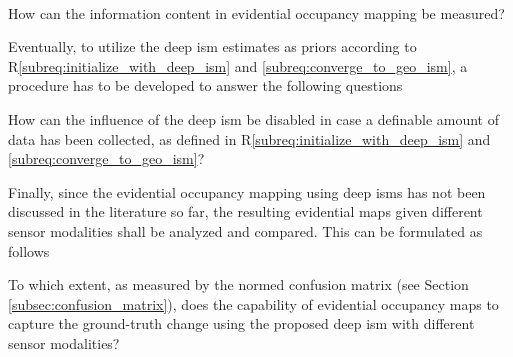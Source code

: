 \\
\begin{requ} \label{requ:how_to_meas_info}
	How can the information content in evidential occupancy mapping be measured?
\end{requ}
Eventually, to utilize the deep \gls{ism} estimates as priors according to R\ref{subreq:initialize_with_deep_ism} and \ref{subreq:converge_to_geo_ism}, a procedure has to be developed to answer the following questions
\\
\begin{requ} \label{requ:disable_deep_ism_influence}
	How can the influence of the deep \gls{ism} be disabled in case a definable amount of data has been collected, as defined in R\ref{subreq:initialize_with_deep_ism} and \ref{subreq:converge_to_geo_ism}?
\end{requ}
Finally, since the evidential occupancy mapping using deep \gls{ism}s has not been discussed in the literature so far, the resulting evidential maps given different sensor modalities shall be analyzed and compared. This can be formulated as follows
\\
\begin{requ} \label{requ:comp_deep_occ_maps}
	To which extent, as measured by the normed confusion matrix (see Section \ref{subsec:confusion_matrix}), does the capability of evidential occupancy maps to capture the ground-truth change using the proposed deep \gls{ism} with different sensor modalities?
\end{requ}
%
